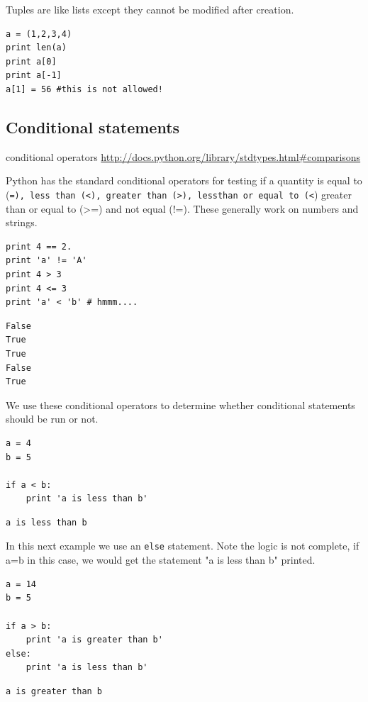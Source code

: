 \documentclass[11pt]{article}
\begin{document}
Tuples are like lists except they cannot be modified after creation.

\begin{verbatim}
a = (1,2,3,4)
print len(a)
print a[0]
print a[-1]
a[1] = 56 #this is not allowed!
\end{verbatim}


\subsection{Conditional statements}
\label{sec:org6b055f2}
conditional operators \url{http://docs.python.org/library/stdtypes.html\#comparisons}

Python has the standard conditional operators for testing if a quantity is equal to (\texttt{=), less than (<), greater than (>), lessthan or equal to (<}) greater than or equal to (>=) and not equal (!=). These generally work on numbers and strings.

\begin{verbatim}
print 4 == 2.
print 'a' != 'A'
print 4 > 3
print 4 <= 3
print 'a' < 'b' # hmmm....
\end{verbatim}

\begin{verbatim}
False
True
True
False
True
\end{verbatim}

We use these conditional operators to determine whether conditional statements should be run or not.

\begin{verbatim}
a = 4
b = 5

if a < b:
    print 'a is less than b'
\end{verbatim}

\begin{verbatim}
a is less than b
\end{verbatim}

In this next example we use an \texttt{else} statement. Note the logic is not complete, if a=b in this case, we would get the statement "a is less than b" printed.
\begin{verbatim}
a = 14
b = 5

if a > b:
    print 'a is greater than b'
else:
    print 'a is less than b'
\end{verbatim}

\begin{verbatim}
a is greater than b
\end{verbatim}
\end{document}

